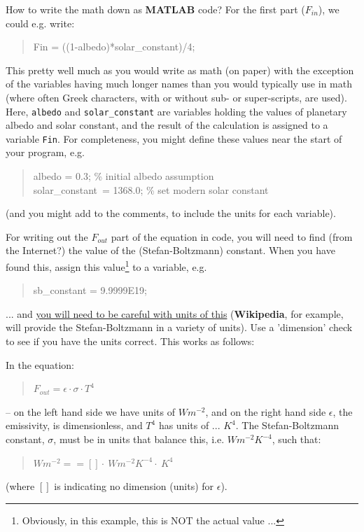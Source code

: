 \documentclass{tufte-book} %
\newenvironment{docspec}{\begin{quotation}\ttfamily\parskip0pt\parindent0pt\ignorespaces}{\end{quotation}}
\newenvironment{docspecnormal}{\begin{quotation}\ttfamily\normalsize\parskip0pt\parindent0pt\ignorespaces}{\end{quotation}}
\begin{document}
\noindent How to write the math down as \textbf{MATLAB} code? For the first part (\(F_{in}\)), we could e.g. write:
\begin{docspec}
Fin = ((1-albedo)*solar\_constant)/4;
\end{docspec}
This pretty well much as you would write as math (on paper) with the exception of the variables having much longer names than you would typically use in math (where often Greek characters, with or without sub- or super-scripts, are used). Here, \texttt{albedo} and \texttt{solar\_constant} are variables holding the values of planetary albedo and solar constant, and the result of the calculation is assigned to a variable \texttt{Fin}. For completeness, you might define these values near the start of your program, e.g.
\begin{docspec}
albedo = 0.3; \textcolor[rgb]{0,0.501961,0}{\% initial albedo assumption}\\
solar\_constant\ = 1368.0; \textcolor[rgb]{0,0.501961,0}{\% set modern solar constant}\\

\end{docspec}
(and you might add to the comments, to include the units for each variable).

\noindent For writing out the \(F_{out}\) part of the equation in code, you will need to find (from the Internet?) the value of the (Stefan-Boltzmann) constant. When you have found this, assign this value\footnote{Obviously, in this example, this is NOT the actual value ...} to a variable, e.g.
\begin{docspec}
sb\_constant = 9.9999E19;
\end{docspec}

\noindent ... and \uline{you will need to be careful with units of this} (\textbf{Wikipedia}, for example, will provide the Stefan-Boltzmann in a variety of units). Use a 'dimension' check to see if you have the units correct. This works as follows:

In the equation:
\begin{docspecnormal}
\(F_{out} = \epsilon \cdot \sigma \cdot T^{4}\)
\end{docspecnormal}
-- on the left hand side we have units of \(W m^{-2}\), and on the right hand side \(\epsilon\), the emissivity, is dimensionless, and \(T^{4}\) has units of ... \(K^{4}\). The Stefan-Boltzmann constant, \(\sigma\), must be in units that balance this, i.e. \(W m^{-2} K^{-4}\), such that:
\begin{docspecnormal}
\(W m^{-2} == [] \cdot\ W m^{-2} K^{-4} \cdot\ K^{4}\)
\end{docspecnormal}
(where \([]\) is indicating no dimension (units) for \(\epsilon\)).
\end{document}
